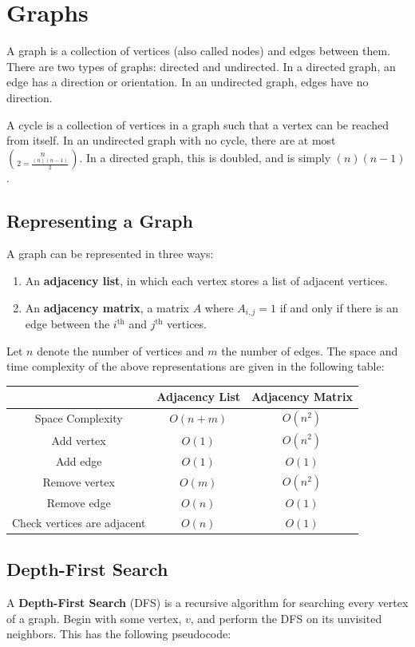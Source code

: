 \documentclass[a4paper]{article}
\theoremstyle{definition}
\begin{document}
\section{Graphs}
A graph is a collection of vertices (also called nodes) and edges between them. There are two types of graphs: directed and undirected. In a directed graph, an edge has a direction or orientation. In an undirected graph, edges have no direction. 

A cycle is a collection of vertices in a graph such that a vertex can be reached from itself. In an undirected graph with no cycle, there are at most $n \choose 2=\frac{(n)(n-1)}{2}$. In a directed graph, this is doubled, and is simply $(n)(n-1)$. 
\subsection{Representing a Graph}
A graph can be represented in three ways:
\begin{enumerate}
 \item An \textbf{adjacency list}, in which each vertex stores a list of adjacent vertices.
 \item An \textbf{adjacency matrix}, a matrix $A$ where $A_{i,j}=1$ if and only if there is an edge between the $i^{\text{th}}$ and $j^{\text{th}}$ vertices.
\end{enumerate}

Let $n$ denote the number of vertices and $m$ the number of edges. The space and time complexity of the above representations are given in the following table:
\begin{center}
\begin{tabular}{|c|c|c|}\hline
 & Adjacency List & Adjacency Matrix\\\hline
 Space Complexity & $O(n+m)$ & $O(n^2)$\\\hline
 Add vertex & $O(1)$ & $O(n^2)$\\\hline
 Add edge & $O(1)$ & $O(1)$\\\hline
 Remove vertex & $O(m)$ & $O(n^2)$\\\hline
 Remove edge & $O(n)$ & $O(1)$\\\hline
 Check vertices are adjacent & $O(n)$ & $O(1)$\\\hline
\end{tabular}
\end{center}
\subsection{Depth-First Search}
A \textbf{Depth-First Search} (DFS) is a recursive algorithm for searching every vertex of a graph. Begin with some vertex, $v$, and perform the DFS on its unvisited neighbors. This has the following pseudocode:
\end{document}
